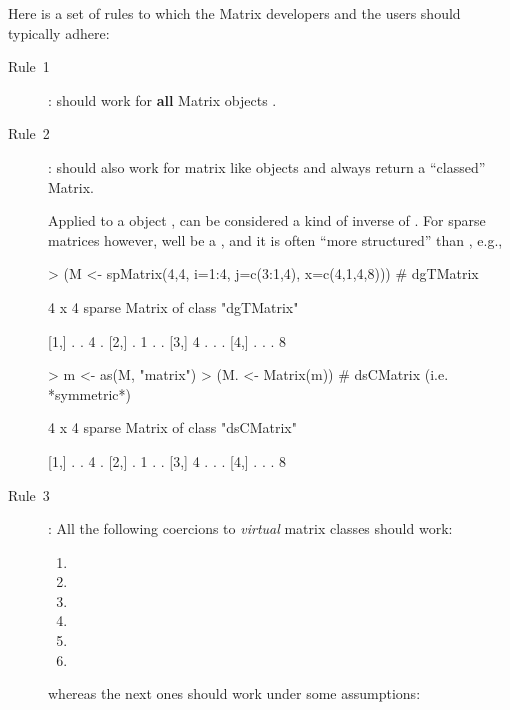 \documentclass{article}
\begin{document}
Here is a set of rules to which the Matrix developers and the users
should typically adhere:
\begin{description}

\item[Rule~1]:   should work for \textbf{all} Matrix
  objects .

\item[Rule~2]:   should also work for matrix like
objects  and always return a ``classed'' Matrix.

Applied to a  object ,  can be
considered a kind of inverse of .
For sparse matrices however,  well be a
, and it is often ``more structured'' than ,
e.g.,
\begin{Schunk}
\begin{Sinput}
> (M <- spMatrix(4,4, i=1:4, j=c(3:1,4), x=c(4,1,4,8))) # dgTMatrix
\end{Sinput}
\begin{Soutput}
4 x 4 sparse Matrix of class "dgTMatrix"
            
[1,] . . 4 .
[2,] . 1 . .
[3,] 4 . . .
[4,] . . . 8
\end{Soutput}
\begin{Sinput}
> m <- as(M, "matrix")
> (M. <- Matrix(m)) # dsCMatrix (i.e. *symmetric*)
\end{Sinput}
\begin{Soutput}
4 x 4 sparse Matrix of class "dsCMatrix"
            
[1,] . . 4 .
[2,] . 1 . .
[3,] 4 . . .
[4,] . . . 8
\end{Soutput}
\end{Schunk}


\item[Rule~3]: All the following coercions to \emph{virtual} matrix
  classes should work:\\
  \begin{enumerate}
  \item {}
  \item {}
  \item {}

  \item {}
  \item {}

  \item {}
  \end{enumerate}
  whereas the next ones should work under some assumptions:


\end{description}
\end{document}
